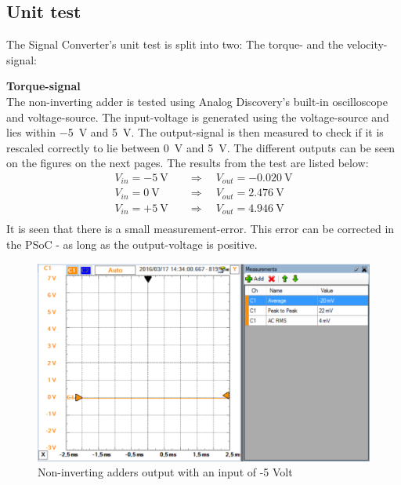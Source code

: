 \subsection{Unit test}
The Signal Converter's unit test is split into two: The torque- and the velocity-signal:

\textbf{Torque-signal}\\
The non-inverting adder is tested using Analog Discovery's built-in oscilloscope and voltage-source. The input-voltage is generated using the voltage-source and lies within \SI{-5}{\volt} and \SI{+5}{\volt}. The output-signal is then measured to check if it is rescaled correctly to lie between \SI{0}{\volt} and \SI{+5}{\volt}. The different outputs can be seen on the figures on the next pages. The results from the test are listed below:
\begin{equation}
	\begin{split}
		V_{in} = -\SI{5}{\volt} \quad &\Rightarrow \quad V_{out} = \SI{-0.020}{\volt}\\
		V_{in} = \SI{0}{\volt} \quad &\Rightarrow \quad V_{out} = \SI{2.476}{\volt}\\
		V_{in} = +\SI{5}{\volt} \quad &\Rightarrow \quad V_{out} = \SI{4.946}{\volt}\\
	\end{split}
\end{equation}
It is seen that there is a small measurement-error. This error can be corrected in the PSoC - as long as the output-voltage is positive. 


\begin{figure}[H]
	\centering
	\includegraphics[width=0.9\linewidth]{Hardware/SignalConverter/Torque_test1}
	\caption{Non-inverting adders output with an input of -5 Volt}
	\label{fig:TorqueTest1}
\end{figure}

